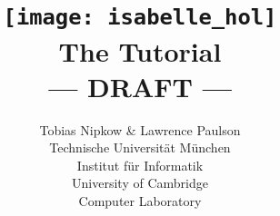 \documentclass{article}
\begin{document}
\title{\texttt{[image: isabelle\_hol]}
       \\ \vspace{0.5cm} The Tutorial
       \\ --- DRAFT ---}
\author{Tobias Nipkow \& Lawrence Paulson\\[1ex]
Technische Universit{\"a}t M{\"u}nchen \\
Institut f{\"u}r Informatik \\[1ex]
University of Cambridge\\
Computer Laboratory}
\maketitle

\setcounter{page}{5}



\tableofcontents

\newpage{}











\printindex
\end{document}
